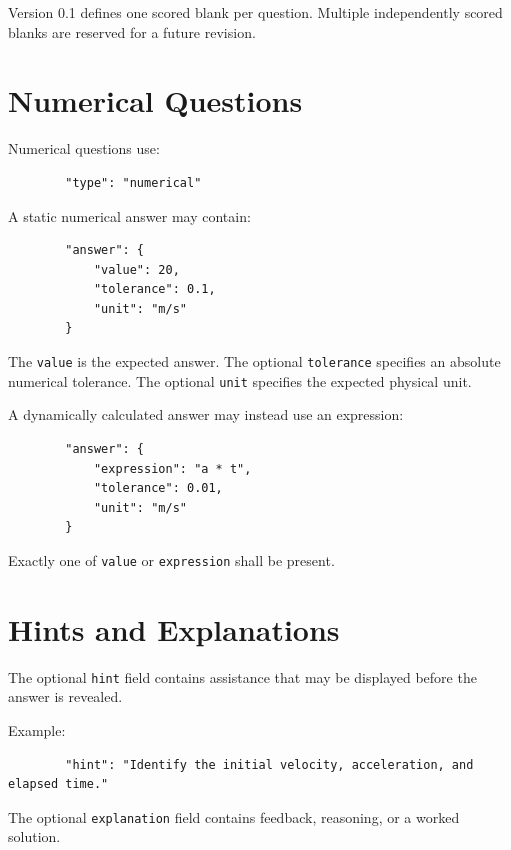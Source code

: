 \documentclass[11pt]{article}
\begin{document}
	Version 0.1 defines one scored blank per question.
	Multiple independently scored blanks are reserved for a future revision.
	
	\section{Numerical Questions}
	
	Numerical questions use:
	
	\begin{lstlisting}
		"type": "numerical"
	\end{lstlisting}
	
	A static numerical answer may contain:
	
	\begin{lstlisting}
		"answer": {
			"value": 20,
			"tolerance": 0.1,
			"unit": "m/s"
		}
	\end{lstlisting}
	
	The \texttt{value} is the expected answer.
	The optional \texttt{tolerance} specifies an absolute numerical tolerance.
	The optional \texttt{unit} specifies the expected physical unit.
	
	A dynamically calculated answer may instead use an expression:
	
	\begin{lstlisting}
		"answer": {
			"expression": "a * t",
			"tolerance": 0.01,
			"unit": "m/s"
		}
	\end{lstlisting}
	
	Exactly one of \texttt{value} or \texttt{expression} shall be present.
	
	\section{Hints and Explanations}
	
	The optional \texttt{hint} field contains assistance that may be displayed
	before the answer is revealed.
	
	Example:
	
	\begin{lstlisting}
		"hint": "Identify the initial velocity, acceleration, and elapsed time."
	\end{lstlisting}
	
	The optional \texttt{explanation} field contains feedback, reasoning, or a
	worked solution.
	
\end{document}
